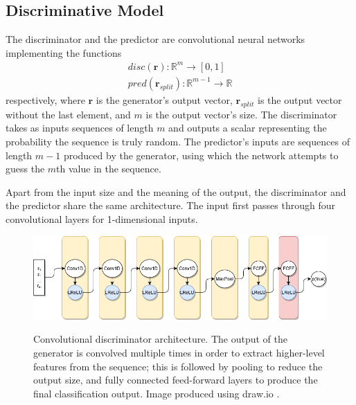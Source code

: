 \documentclass[12pt, titlepage]{report}
\theoremstyle{definition}
\begin{document}
\subsection{Discriminative Model}
The discriminator and the predictor are convolutional neural networks implementing the functions
\begin{gather}
disc(\bm{r}) : \mathbb{R}^m \rightarrow [0, 1] \\
pred(\bm{r}_{split}) : \mathbb{R}^{m - 1} \rightarrow \mathbb{R}
\end{gather}
respectively, where $\bm{r}$ is the generator's output vector, $\bm{r}_{split}$ is the output vector without the last element, and $m$ is the output vector's size. The discriminator takes as inputs sequences of length $m$ and outputs a scalar representing the probability the sequence is truly random. The predictor's inputs are sequences of length $m-1$ produced by the generator, using which the network attempts to guess the $m$th value in the sequence.

Apart from the input size and the meaning of the output, the discriminator and the predictor share the same architecture. The input first passes through four convolutional layers for 1-dimensional inputs.

\begin{figure}
\centering
\includegraphics[width=1\textwidth]{img/discriminator.png}\\
\caption{Convolutional discriminator architecture. The output of the generator is convolved multiple times in order to extract higher-level features from the sequence; this is followed by pooling to reduce the output size, and fully connected feed-forward layers to produce the final classification output. Image produced using draw.io \cite{jgraph2018draw}.}
\label{figure:architecture_conv}
\end{figure}
\end{document}
